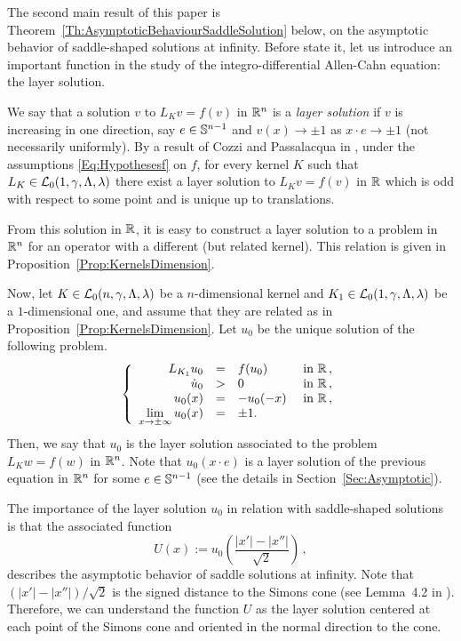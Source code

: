 The second main result of this paper is Theorem~\ref{Th:AsymptoticBehaviourSaddleSolution} below, on the asymptotic behavior of saddle-shaped solutions at infinity. Before state it, let us introduce an important function in the study of the integro-differential Allen-Cahn equation: the layer solution.


We say that a solution $v$ to $L_K v = f(v)$ in $\mathbb{R}^n$ is a \emph{layer solution} if $v$ is increasing in one direction, say $e\in \mathbb{S}^{n-1}$ and $v(x) \to \pm 1$ as $x\cdot e \to \pm 1$ (not necessarily uniformly). By a result of Cozzi and Passalacqua in \cite{CozziPassalacqua}, under the assumptions \eqref{Eq:Hypothesesf} on $f$, for every kernel $K$ such that $L_K\in \mathcal{L}_0(1,\gamma,\Lambda, \lambda)$ there exist a layer solution  to $L_K v = f(v)$ in $\mathbb{R}$ which is odd with respect to some point and is unique up to translations. 

From this solution in $\mathbb{R}$, it is easy to construct a layer solution to a problem in $\mathbb{R}^n$ for an operator with a different (but related kernel). This relation is given in Proposition~\ref{Prop:KernelsDimension}. 


Now, let $K\in\mathcal{L}_0(n,\gamma,\Lambda, \lambda)$ be a $n$-dimensional kernel and $K_1\in \mathcal{L}_0(1,\gamma,\Lambda, \lambda)$ be a $1$-dimensional one, and assume that they are related as in Proposition~\ref{Prop:KernelsDimension}. Let $u_0$ be the unique solution of the following problem.
	\begin{equation}
	\label{Eq:LayerSolution}
	\left\{\begin{array}{rcll}
	L_{K_1}  u_0 &=& f(u_0) & \textrm{ in }\mathbb{R}\,,\\
	\dot{u}_0 &>& 0 & \textrm{ in } \mathbb{R}\,,\\
	u_0(x) & = &-u_0(-x)  & \textrm{ in }\mathbb{R}\,,\\
	\displaystyle \lim_{x \to \pm \infty} u_0(x) &=& \pm 1. & 
	\end{array} \right.
	\end{equation}
Then, we say that $u_0$ is the layer solution associated to the problem $L_K w = f(w)$ in $\mathbb{R}^{n}$. Note that $u_0(x\cdot e)$ is a layer solution of the previous equation in $\mathbb{R}^n$ for some $e\in \mathbb{S}^{n-1}$ (see the details in Section~\ref{Sec:Asymptotic}).

The importance of the layer solution $u_0$ in relation with saddle-shaped solutions is that the associated function
	\begin{equation}
	\label{Eq:DefOfU}
	U(x):= u_0 \left( \dfrac{|x'| - |x''|}{\sqrt{2}} \right)\,,
	\end{equation}
describes the asymptotic behavior of saddle solutions at infinity. Note that $(|x'| - |x''| )/\sqrt{2}$ is the signed distance to the Simons cone (see Lemma~4.2 in \cite{CabreTerraII}). Therefore, we can understand the function $U$ as the layer solution centered at each point of the Simons cone and oriented in the normal direction to the cone.

